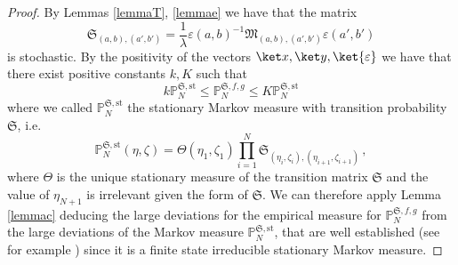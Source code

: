 \documentclass[reqno]{amsart}
\theoremstyle{plain}
\theoremstyle{definition}
\theoremstyle{remark}
\numberwithin{equation}{section}
\numberwithin{theorem}{section}
\newcommand{\<}{\langle}
\renewcommand{\>}{\rangle}
\begin{document}
	\begin{proof}
		By Lemmas \ref{lemmaT}, \ref{lemmae} we have that the matrix 
		\begin{equation}\label{Sdef}
			\mathfrak S_{(a,b),(a',b')}=\frac 1\lambda \varepsilon(a,b)^{-1}\mathfrak M_{(a,b),(a',b')}\varepsilon(a',b')
		\end{equation}
		is stochastic.
		By the positivity of the vectors $\ket x,\ket y,\ket{\varepsilon}$ we have that there exist positive constants $k,K$ such that 
		$$k \mathbb P_N^{\mathfrak S, \mathrm{st}}\leq \mathbb P_N^{\mathfrak S, f,g}\leq K\mathbb P_N^{\mathfrak S, \mathrm{st}}$$ where we called $\mathbb P_N^{\mathfrak S,\mathrm{st}}$ the stationary Markov measure with transition probability $\mathfrak S$, i.e.
		\begin{equation}
			\mathbb P_N^{\mathfrak S, \mathrm{st}}(\eta,\zeta)=\Theta(\eta_1,\zeta_1)\prod_{i=1}^{N}\mathfrak S_{(\eta_i,\zeta_i),(\eta_{i+1},\zeta_{i+1})}\,,
		\end{equation}
		where $\Theta$ is the unique stationary measure of the transition matrix $\mathfrak S$ and the value of $\eta_{N+1}$ is irrelevant given the form of $\mathfrak S$.
		We can therefore apply Lemma \ref{lemmac} deducing the large deviations for the empirical measure for $\mathbb P_N^{\mathfrak S, f,g}$ from the large deviations of the Markov measure $\mathbb P_N^{\mathfrak S,\mathrm{st}}$, that are well established (see for example \cite{denH}) since it is a finite state irreducible  stationary Markov measure. 
		

\end{proof}
\end{document}
